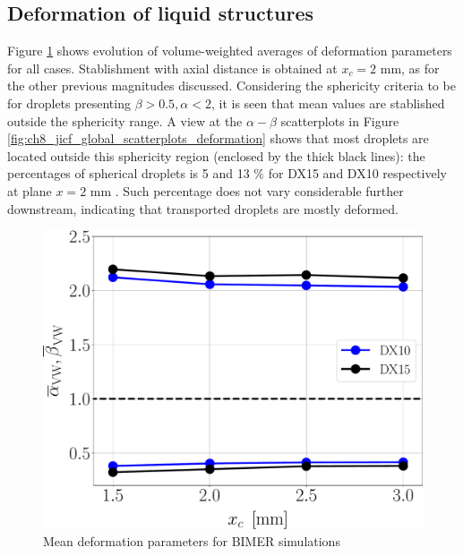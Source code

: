 \vspace*{-0.20in}


\subsection{Deformation of liquid structures}
\label{subsec:ch8_def_liquid_structures}

Figure \ref{fig:ch8_jicf_liquid_mean_deformation_with_x_condensed} shows evolution of volume-weighted averages of deformation parameters for all cases. Stablishment with axial distance is obtained at $x_c = 2$ mm, as for the other previous magnitudes discussed. Considering the sphericity criteria to be for droplets presenting $\beta > 0.5, \alpha < 2$, it is seen that mean values are stablished outside the sphericity range. A view at the $\alpha-\beta$ scatterplots in Figure \ref{fig:ch8_jicf_global_scatterplots_deformation} shows that most droplets are located outside this sphericity region (enclosed by the thick black lines): the percentages of spherical droplets is 5 and 13 $\%$ for DX15 and DX10 respectively at plane $x = 2$ mm . Such percentage does not vary considerable further downstream, indicating that transported droplets are mostly deformed. 

\clearpage

\begin{figure}[ht]
\centering
   \includegraphics[scale=0.25]{./part3_applications/figures_ch8_resolved/SPRAY_characterization/deformation/deformation_both_alpha_beta_mean}
   \caption{Mean deformation parameters for BIMER simulations}
\label{fig:ch8_jicf_liquid_mean_deformation_with_x_condensed}
\end{figure}


